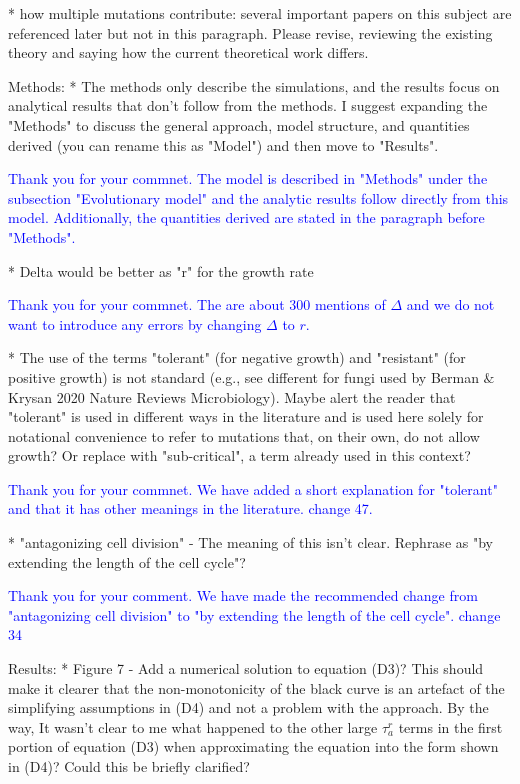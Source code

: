 \documentclass[11pt,a4paper]{article}
\begin{document}
* how multiple mutations contribute: several important papers on this subject are referenced later but not in this paragraph. Please revise, reviewing the existing theory and saying how the current theoretical work differs.

Methods:
* The methods only describe the simulations, and the results focus on analytical results that don't follow from the methods. I suggest expanding the "Methods" to discuss the general approach, model structure, and quantities derived (you can rename this as "Model") and then move to "Results".

\textcolor{blue}{Thank you for your commnet. The model is described in "Methods" under the subsection "Evolutionary model" and the analytic results follow directly from this model. Additionally, the quantities derived are stated in the paragraph before "Methods". } 

* Delta would be better as "r" for the growth rate

\textcolor{blue}{Thank you for your commnet. The are about 300 mentions of $\Delta$ and we do not want to introduce any errors by changing $\Delta$ to $r$.}

* The use of the terms "tolerant" (for negative growth) and "resistant" (for positive growth) is not standard (e.g., see different for fungi used by Berman $\&$ Krysan 2020 Nature Reviews Microbiology). Maybe alert the reader that "tolerant" is used in different ways in the literature and is used here solely for notational convenience to refer to mutations that, on their own, do not allow growth? Or replace with "sub-critical", a term already used in this context?

\textcolor{blue}{Thank you for your commnet. We have added a short explanation for "tolerant" and that it has other meanings in the literature. change 47.}

* "antagonizing cell division" - The meaning of this isn't clear. Rephrase as "by extending the length of the cell cycle"?

\textcolor{blue}{Thank you for your comment. We have made the recommended change from "antagonizing cell division" to "by extending the length of the cell cycle". change 34} 

Results:
* Figure 7 - Add a numerical solution to equation (D3)? This should make it clearer that the non-monotonicity of the black curve is an artefact of the simplifying assumptions in (D4) and not a problem with the approach. By the way, It wasn't clear to me what happened to the other large $\tau_a^r$ terms in the first portion of equation (D3) when approximating the equation into the form shown in (D4)? Could this be briefly clarified?
\end{document}
